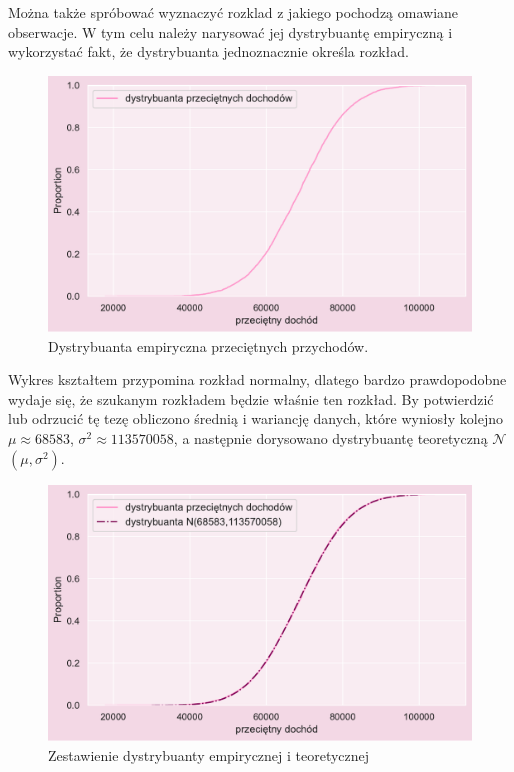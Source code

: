 \documentclass{article}
\begin{document}
   
 \noindent Można także spróbować wyznaczyć rozklad z jakiego pochodzą omawiane obserwacje. W tym celu należy narysować jej dystrybuantę empiryczną i wykorzystać fakt, że dystrybuanta jednoznacznie określa rozkład.
    \begin{figure}[H]
	\begin{center}
		\includegraphics[scale=0.68]{images/income_dystr1.pdf}
		\caption{Dystrybuanta empiryczna przeciętnych przychodów.}
		\label{denistyx}
	\end{center}
	\end{figure}
\noindent Wykres kształtem przypomina rozkład normalny, dlatego bardzo prawdopodobne wydaje się, że szukanym rozkładem będzie właśnie ten rozkład. By potwierdzić lub odrzucić tę tezę obliczono średnią i wariancję danych, które wyniosły kolejno $\mu \approx 68583 $, $\sigma^2 \approx 113570058$, a następnie dorysowano dystrybuantę teoretyczną $\mathcal{N}$$(\mu,\sigma^2)$.

    \begin{figure}[H]
	\begin{center}
		\includegraphics[scale=0.68]{images/income_dystr.pdf}
		\caption{Zestawienie dystrybuanty empirycznej i teoretycznej}
		\label{fig:income_dystr}
	\end{center}
	\end{figure}
\end{document}
